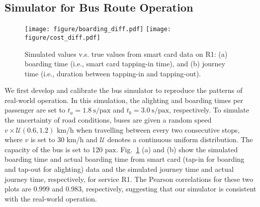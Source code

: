 \documentclass{article}
\begin{document}
\subsection{Simulator for Bus Route Operation}
\begin{figure}[!b]
\centering
 \texttt{[image: figure/boarding\_diff.pdf]} \qquad
\texttt{[image: figure/cost\_diff.pdf]}
\caption{Simulated values v.s. true values from smart card data on R1: (a) boarding time (i.e., smart card tapping-in time), and (b) journey time (i.e., duration between tapping-in and tapping-out). }
   \label{sim}
 \end{figure}
We first develop and calibrate the bus simulator to reproduce the patterns of real-world operation.
In this simulation, the alighting and boarding times per passenger are set to $t_a=1.8\ \text{s/pax}$ and $t_b=3.0 \ \text{s/pax}$, respectively. To simulate the uncertainty of road conditions, buses are given a random speed $v\times\mathcal{U}(0.6,1.2)$ km/h when travelling between every two consecutive stops, where $v$ is set to 30 km/h and $\mathcal{U}$ denotes a continuous uniform distribution. The capacity of the bus is set to 120 $\text{pax}$.
Fig.~\ref{sim} (a) and (b) show the simulated boarding time and actual boarding time from smart card (tap-in for boarding and tap-out for alighting) data and the simulated journey time and actual journey time, respectively, for service R1. The Pearson correlations for these two plots are 0.999 and 0.983, respectively, suggesting that our simulator is consistent with the real-world operation.
\end{document}
